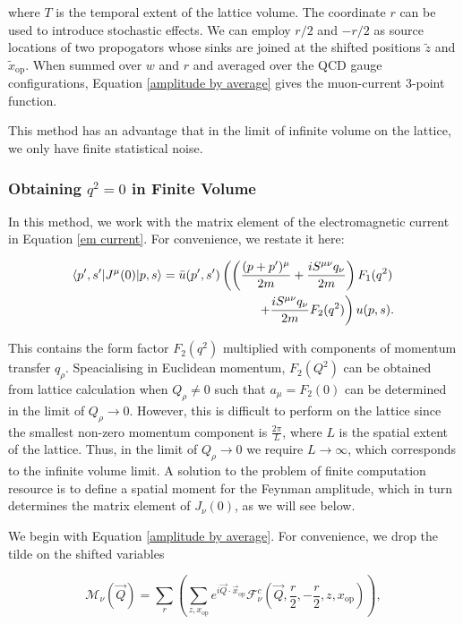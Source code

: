 \documentclass{article}
\numberwithin{equation}{section} %
\begin{document}
\noindent where $T$ is the temporal extent of the lattice volume. The coordinate $r$ can be used to introduce stochastic effects. We can employ $r/2$ and $-r/2$ as source locations of two propogators whose sinks are joined at the shifted positions $\tilde{z}$ and $\tilde{x}_\mathrm{op}$. When summed over $w$ and $r$ and averaged over the QCD gauge configurations, Equation \ref{amplitude by average} gives the muon-current 3-point function. 

This method has an advantage that in the limit of infinite volume on the lattice, we only have finite statistical noise.


\subsubsection{Obtaining $q^2=0$ in Finite Volume}

In this method, we work with the matrix element of the electromagnetic current in Equation \ref{em current}. For convenience, we restate it here:

\begin{equation}
\begin{split}
\mathinner{\langle{p',s'|J^\mu(0)|p,s}\rangle} = \bar{u}(p',s')\left( \left( \frac{(p+p')^\mu }{2m} + \frac{iS^{\mu\nu}q_\nu}{2m} \right) F_1(q^2)\right.&\\
\left. + \frac{iS^{\mu\nu}q_\nu}{2m}F_2(q^2) \right)u(p,s).&
\end{split}
\label{em current (repeated)}
\end{equation}

This contains the form factor $F_2(q^2)$ multiplied with components of momentum transfer $q_\rho$. Speacialising in Euclidean momentum, $F_2(Q^2)$ can be obtained from lattice calculation when $Q_\rho \neq 0$ such that $a_\mu = F_2(0)$ can be determined in the limit of $Q_\rho\rightarrow 0$. However, this is difficult to perform on the lattice since the smallest non-zero momentum component is $\frac{2\pi}{L}$, where $L$ is the spatial extent of the lattice. Thus, in the limit of $Q_\rho \rightarrow 0$ we require $L\rightarrow\infty$, which corresponds to the infinite volume limit. A solution to the problem of finite computation resource is to define a spatial moment for the Feynman amplitude, which in turn determines the matrix element of $J_\nu(0)$, as we will see below.

We begin with Equation \ref{amplitude by average}. For convenience, we drop the tilde on the shifted variables

\begin{equation}
\mathcal{M}_\nu(\vec{Q})= \sum_r\left(\sum_{z,x_\mathrm{op}} e^{i\vec{Q}\cdot\vec{x}_\mathrm{op}} \mathcal{F}^c_\nu(\vec{Q},\frac{r}{2},-\frac{r}{2},z,x_\mathrm{op})\right),
\label{amplitude by average repeated}
\end{equation}
\end{document}
